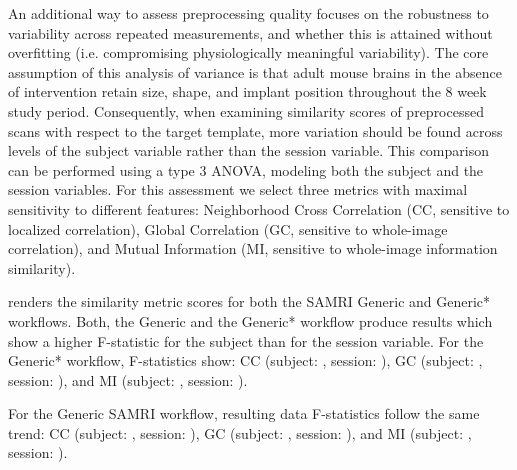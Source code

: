 An additional way to assess preprocessing quality focuses on the robustness to variability across repeated measurements, and whether this is attained without overfitting (i.e. compromising physiologically meaningful variability).
The core assumption of this analysis of variance is that adult mouse brains in the absence of intervention retain size, shape, and implant position throughout the 8 week study period.
Consequently, when examining similarity scores of preprocessed scans with respect to the target template, more variation should be found across levels of the subject variable rather than the session variable.
This comparison can be performed using a type 3 ANOVA, modeling both the subject and the session variables.
For this assessment we select three metrics with maximal sensitivity to different features:
Neighborhood Cross Correlation (CC, sensitive to localized correlation),
Global Correlation (GC, sensitive to whole-image correlation),
and Mutual Information (MI, sensitive to whole-image information similarity).

 renders the similarity metric scores for both the SAMRI Generic and Generic* workflows.
Both, the Generic and the Generic* workflow produce results which show a higher F-statistic for the subject than for the session variable.
For the Generic* workflow, F-statistics show:
CC (subject: , session: ),
GC (subject: , session: ),
and MI (subject: , session: ).

For the Generic SAMRI workflow, resulting data F-statistics follow the same trend:
CC (subject: , session: ),
GC (subject: , session: ),
and MI (subject: , session: ).
